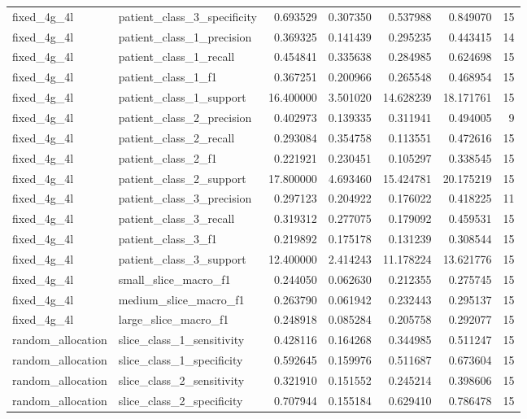 \begin{tabular}{llrrrrr}
fixed_4g_4l & patient_class_3_specificity & 0.693529 & 0.307350 & 0.537988 & 0.849070 & 15 \\
fixed_4g_4l & patient_class_1_precision & 0.369325 & 0.141439 & 0.295235 & 0.443415 & 14 \\
fixed_4g_4l & patient_class_1_recall & 0.454841 & 0.335638 & 0.284985 & 0.624698 & 15 \\
fixed_4g_4l & patient_class_1_f1 & 0.367251 & 0.200966 & 0.265548 & 0.468954 & 15 \\
fixed_4g_4l & patient_class_1_support & 16.400000 & 3.501020 & 14.628239 & 18.171761 & 15 \\
fixed_4g_4l & patient_class_2_precision & 0.402973 & 0.139335 & 0.311941 & 0.494005 & 9 \\
fixed_4g_4l & patient_class_2_recall & 0.293084 & 0.354758 & 0.113551 & 0.472616 & 15 \\
fixed_4g_4l & patient_class_2_f1 & 0.221921 & 0.230451 & 0.105297 & 0.338545 & 15 \\
fixed_4g_4l & patient_class_2_support & 17.800000 & 4.693460 & 15.424781 & 20.175219 & 15 \\
fixed_4g_4l & patient_class_3_precision & 0.297123 & 0.204922 & 0.176022 & 0.418225 & 11 \\
fixed_4g_4l & patient_class_3_recall & 0.319312 & 0.277075 & 0.179092 & 0.459531 & 15 \\
fixed_4g_4l & patient_class_3_f1 & 0.219892 & 0.175178 & 0.131239 & 0.308544 & 15 \\
fixed_4g_4l & patient_class_3_support & 12.400000 & 2.414243 & 11.178224 & 13.621776 & 15 \\
fixed_4g_4l & small_slice_macro_f1 & 0.244050 & 0.062630 & 0.212355 & 0.275745 & 15 \\
fixed_4g_4l & medium_slice_macro_f1 & 0.263790 & 0.061942 & 0.232443 & 0.295137 & 15 \\
fixed_4g_4l & large_slice_macro_f1 & 0.248918 & 0.085284 & 0.205758 & 0.292077 & 15 \\
random_allocation & slice_class_1_sensitivity & 0.428116 & 0.164268 & 0.344985 & 0.511247 & 15 \\
random_allocation & slice_class_1_specificity & 0.592645 & 0.159976 & 0.511687 & 0.673604 & 15 \\
random_allocation & slice_class_2_sensitivity & 0.321910 & 0.151552 & 0.245214 & 0.398606 & 15 \\
random_allocation & slice_class_2_specificity & 0.707944 & 0.155184 & 0.629410 & 0.786478 & 15 \\

\end{tabular}
